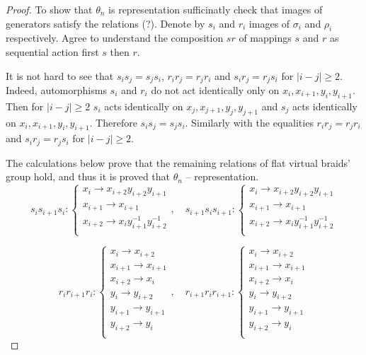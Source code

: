 \documentclass{article}
\begin{document}
\begin{proof}
To show that $\theta_n$ is representation sufficinatly check that images of generators satisfy the relations (?). Denote by $s_i$ and $r_i$ images of $\sigma_i$ and $\rho_i$ respectively. Agree to understand the composition $sr$ of mappings $s$ and $r$ as sequential action first $s$ then $r$.

It is not hard to see that $s_is_j=s_js_i$, $r_ir_j=r_jr_i$ and $s_ir_j=r_js_i$ for $|i-j|\ge2$. Indeed, automorphisms $s_i$ and $r_i$ do not act identically only on $x_i, x_{i+1}, y_i, y_{i+1}$. Then for $|i-j|\ge2$  $s_i$ acts identically on  $x_j, x_{j+1}, y_j, y_{j+1}$ and $s_j$ acts identically on  $x_i, x_{i+1}, y_i, y_{i+1}$. Therefore $s_is_j=s_js_i$. Similarly with the equalities $r_ir_j=r_jr_i$ and $s_ir_j=r_js_i$ for $|i-j|\ge2$.

The calculations below prove that the remaining relations of flat virtual braids' group hold, and thus it is proved that $\theta_n$ -- representation.
$$
s_is_{i+1}s_i:
\begin{cases}
x_i\rightarrow x_{i+2}y_{i+2}y_{i+1}\\
x_{i+1}\rightarrow x_{i+1}\\
x_{i+2}\rightarrow x_iy_{i+1}^{-1}y_{i+2}^{-1}\\
\end{cases}, \quad
s_{i+1}s_is_{i+1}:
\begin{cases}
x_i\rightarrow x_{i+2}y_{i+2}y_{i+1}\\
x_{i+1}\rightarrow x_{i+1}\\
x_{i+2}\rightarrow x_iy_{i+1}^{-1}y_{i+2}^{-1}\\
\end{cases} 
$$

$$
r_ir_{i+1}r_i:
\begin{cases}
x_i\rightarrow x_{i+2}\\
x_{i+1}\rightarrow x_{i+1}\\
x_{i+2}\rightarrow x_i\\
y_{i} \rightarrow y_{i+2}\\
y_{i+1} \rightarrow y_{i+1}\\
y_{i+2} \rightarrow y_{i}\\
\end{cases} , \quad
r_{i+1}r_ir_{i+1}:
\begin{cases}
x_i\rightarrow x_{i+2}\\
x_{i+1}\rightarrow x_{i+1}\\
x_{i+2}\rightarrow x_i\\
y_{i} \rightarrow y_{i+2}\\
y_{i+1} \rightarrow y_{i+1}\\
y_{i+2} \rightarrow y_{i}\\
\end{cases} 
$$


\end{proof}
\end{document}
